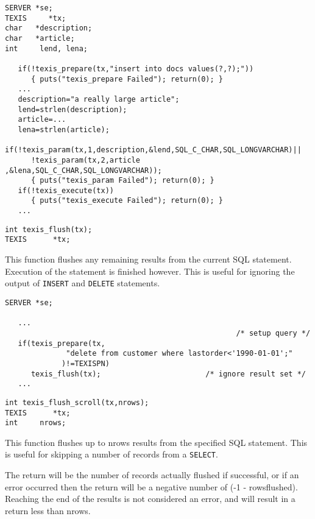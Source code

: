 \EXAMPLE
\begin{verbatim}
SERVER *se;
TEXIS     *tx;
char   *description;
char   *article;
int     lend, lena;

   if(!texis_prepare(tx,"insert into docs values(?,?);"))
      { puts("texis_prepare Failed"); return(0); }
   ...
   description="a really large article";
   lend=strlen(description);
   article=...
   lena=strlen(article);
   if(!texis_param(tx,1,description,&lend,SQL_C_CHAR,SQL_LONGVARCHAR)||
      !texis_param(tx,2,article    ,&lena,SQL_C_CHAR,SQL_LONGVARCHAR));
      { puts("texis_param Failed"); return(0); }
   if(!texis_execute(tx))
      { puts("texis_execute Failed"); return(0); }
   ...
\end{verbatim}


\SYNOPSIS
\begin{verbatim}
int texis_flush(tx);
TEXIS      *tx;
\end{verbatim}

\DESCRIPTION

This function flushes any remaining results from the current SQL
statement. Execution of the statement is finished however. This
is useful for ignoring the output of \verb`INSERT` and \verb`DELETE` statements.

\EXAMPLE
\begin{verbatim}
SERVER *se;

   ...
                                                     /* setup query */
   if(texis_prepare(tx,
              "delete from customer where lastorder<'1990-01-01';"
             )!=TEXISPN)
      texis_flush(tx);                        /* ignore result set */
   ...
\end{verbatim}



\SYNOPSIS
\begin{verbatim}
int texis_flush_scroll(tx,nrows);
TEXIS      *tx;
int     nrows;
\end{verbatim}

\DESCRIPTION

This function flushes up to nrows results from the specified SQL
statement. This is useful for skipping a number of records from
a \verb`SELECT`.

The return will be the number of records actually flushed if
successful, or if an error occurred then the return will be a
negative number of (-1 - rowsflushed).  Reaching the end of the
results is not considered an error, and will result in a return
less than nrows.

